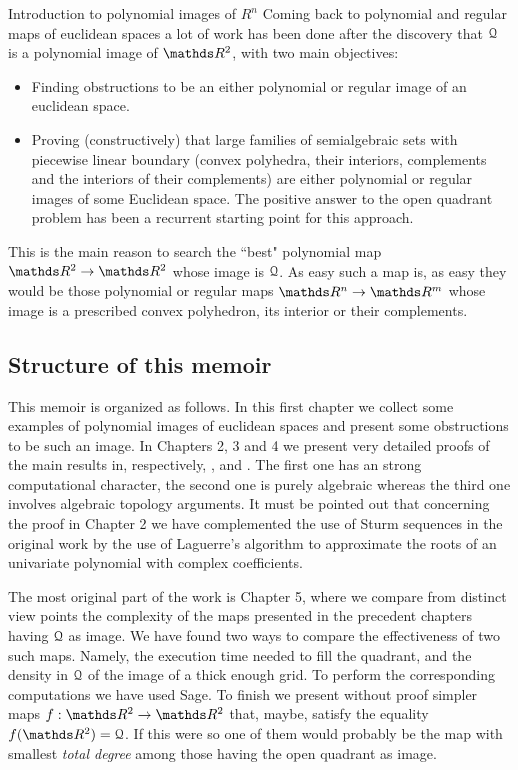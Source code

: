 \documentclass[11pt, a4paper, english, twoside, notitlepage, openright]{report}
\begin{document}
\begin{chapter}{Introduction to polynomial images of $R^n$}
Coming back to polynomial and regular maps of euclidean spaces a lot of work has been done after the discovery that $\mathcal{Q}$ is a polynomial image of $\R^2$, with two main objectives: 
\begin{itemize}
\item Finding obstructions to be an either polynomial or regular image of an euclidean space. 
\item Proving (constructively) that large families of semialgebraic sets with piecewise linear boundary (convex polyhedra, their interiors, complements and the interiors of their complements) are either polynomial or regular images of some Euclidean space. The positive answer to the open quadrant problem has been a recurrent starting point for this approach.
\end{itemize}
This is the main reason to search the ``best" polynomial map $\R^2\to\R^2$ whose image is $\mathcal{Q}$. As easy such a map is, as easy they would be those polynomial or regular maps $\R^n\to\R^m$ whose image is a prescribed convex polyhedron, its interior or their complements. 

\subsection{Structure of this memoir}
This memoir is organized as follows. In this first chapter we collect some examples of polynomial images of euclidean spaces and present some obstructions to be such an image. In Chapters 2, 3 and 4 we present very detailed proofs of the main results in, respectively, \cite{fg}, \cite{fu1} and \cite{fgu}. The first one has an strong computational character, the second one is purely algebraic whereas the third one involves algebraic topology arguments. It must be pointed out that concerning the proof in Chapter 2 we have complemented the use of Sturm sequences in the original work \cite{fg} by the use of Laguerre's algorithm to approximate the roots of an univariate polynomial with complex coefficients.

The most original part of the work is Chapter 5, where we compare from distinct view points the complexity of the maps presented in the precedent chapters having $\mathcal{Q}$ as image. We have found two ways to compare the effectiveness of two such maps. Namely, the execution time needed to fill the quadrant, and the density in $\mathcal{Q}$ of the image of a thick enough grid. To perform the corresponding computations we have used Sage. To finish we present without proof simpler maps $f:\R^2\to\R^2$ that, maybe, satisfy the equality $f(\R^2)=\Qu$. If this were so one of them would probably be the map with smallest \textit{total degree} among those having the open quadrant as image.


\end{chapter}
\end{document}
